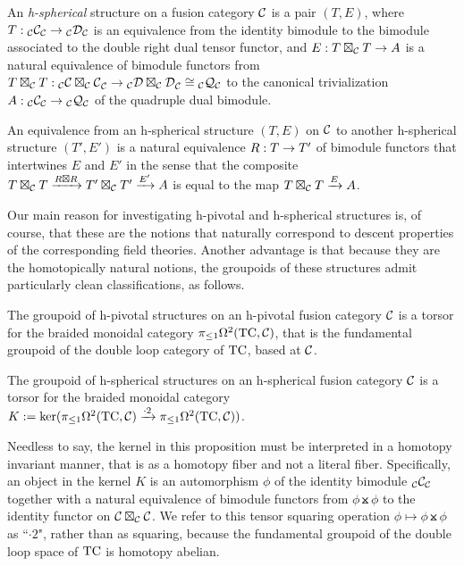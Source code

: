 \documentclass{amsart}
\begin{document}
\begin{definition}
An \emph{h-spherical} structure on a fusion category $\mathcal C$ is a pair $(T,E)$, where $T: {}_{\mathcal C} {\mathcal C}_{\mathcal C} \rightarrow {}_{\mathcal C} {\mathcal D}_{\mathcal C}$ is an equivalence from the identity bimodule to the bimodule associated to the double right dual tensor functor, and $E: T \boxtimes_{\mathcal C} T \rightarrow A$ is a natural equivalence of bimodule functors from $T \boxtimes_{\mathcal C} T: {}_{\mathcal C} {\mathcal C \boxtimes_{\mathcal C} \mathcal C}_{\mathcal C} \rightarrow {}_{\mathcal C} {\mathcal D \boxtimes_{\mathcal C} \mathcal D}_{\mathcal C} \cong {}_{\mathcal C} {\mathcal Q}_{\mathcal C}$ to the canonical trivialization $A : {}_{\mathcal C} {\mathcal C}_{\mathcal C} \rightarrow {}_{\mathcal C} {\mathcal Q}_{\mathcal C}$ of the quadruple dual bimodule.
\end{definition}

An equivalence from an h-spherical structure $(T,E)$ on $\mathcal C$ to another h-spherical structure $(T',E')$ is a natural equivalence $R: T \rightarrow T'$ of bimodule functors that intertwines $E$ and $E'$ in the sense that the composite $T \boxtimes_{\mathcal C} T \xrightarrow{R \boxtimes R} T' \boxtimes_{\mathcal C} T' \xrightarrow{E'} A$ is equal to the map $T \boxtimes_{\mathcal C} T \xrightarrow{E} A$.

Our main reason for investigating h-pivotal and h-spherical structures is, of course, that these are the notions that naturally correspond to descent properties of the corresponding field theories.  Another advantage is that because they are the homotopically natural notions, the groupoids of these structures admit particularly clean classifications, as follows.

\begin{proposition}
The groupoid of h-pivotal structures on an h-pivotal fusion category $\mathcal C$ is a torsor for the braided monoidal category $\pi_{\leq 1} \Omega^2(\mathrm{TC},\mathcal C)$, that is the fundamental groupoid of the double loop category of $\mathrm{TC}$, based at $\mathcal C$.
\end{proposition}

\begin{proposition}
The groupoid of h-spherical structures on an h-spherical fusion category $\mathcal C$ is a torsor for the braided monoidal category $K := \ker(\pi_{\leq 1} \Omega^2(\mathrm{TC},\mathcal C) \xrightarrow{\cdot 2} \pi_{\leq 1} \Omega^2(\mathrm{TC},\mathcal C))$.
\end{proposition}

Needless to say, the kernel in this proposition must be interpreted in a homotopy invariant manner, that is as a homotopy fiber and not a literal fiber.  Specifically, an object in the kernel $K$ is an automorphism $\phi$ of the identity bimodule ${}_{\mathcal C} {\mathcal C}_{\mathcal C}$ together with a natural equivalence of bimodule functors from $\phi \btimes \phi$ to the identity functor on $\mathcal C \boxtimes_{\mathcal C} \mathcal C$.  We refer to this tensor squaring operation $\phi \mapsto \phi \btimes \phi$ as ``$\cdot 2$", rather than as squaring, because the fundamental groupoid of the double loop space of $\mathrm{TC}$ is homotopy abelian.
\end{document}
